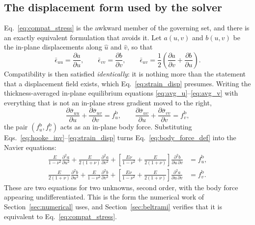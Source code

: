 \documentclass[11pt]{article}
\begin{document}
\subsection{The displacement form used by the solver}\label{sec:displacement_form}
Eq.~\eqref{eq:compat_stress} is the awkward member of the governing set, and
there is an exactly equivalent formulation that avoids it. Let $a(u,v)$ and
$b(u,v)$ be the in-plane displacements along $\hat u$ and $\hat v$, so that
\begin{equation}\label{eq:strain_disp}
    \bar\epsilon_{uu} = \frac{\partial a}{\partial u}, \qquad
    \bar\epsilon_{vv} = \frac{\partial b}{\partial v}, \qquad
    \bar\epsilon_{uv} = \frac{1}{2}\left(\frac{\partial a}{\partial v}
      + \frac{\partial b}{\partial u}\right).
\end{equation}
Compatibility is then satisfied \emph{identically}: it is nothing more than the
statement that a displacement field exists, which Eq.~\eqref{eq:strain_disp}
presumes. Writing the thickness-averaged in-plane equilibrium equations
\eqref{eq:avg_u}--\eqref{eq:avg_v} with everything that is not an in-plane stress
gradient moved to the right,
\begin{equation}\label{eq:body_force_def}
    \frac{\partial \bar\sigma_{uu}}{\partial u}
      + \frac{\partial \bar\sigma_{uv}}{\partial v} = f_u^{\mathrm b},
    \qquad
    \frac{\partial \bar\sigma_{uv}}{\partial u}
      + \frac{\partial \bar\sigma_{vv}}{\partial v} = f_v^{\mathrm b},
\end{equation}
the pair $\left(f_u^{\mathrm b}, f_v^{\mathrm b}\right)$ acts as an in-plane body
force. Substituting Eqs.~\eqref{eq:hooke_inv}--\eqref{eq:strain_disp} turns
Eq.~\eqref{eq:body_force_def} into the Navier equations:
\begin{align}
    \frac{E}{1-\nu^{2}}\frac{\partial^{2} a}{\partial u^{2}}
      + \frac{E}{2\left(1+\nu\right)}\frac{\partial^{2} a}{\partial v^{2}}
      + \left[\frac{E\nu}{1-\nu^{2}}
        + \frac{E}{2\left(1+\nu\right)}\right]
        \frac{\partial^{2} b}{\partial u\,\partial v}
      &= f_u^{\mathrm b},
      \label{eq:navier_u}\\
    \frac{E}{2\left(1+\nu\right)}\frac{\partial^{2} b}{\partial u^{2}}
      + \frac{E}{1-\nu^{2}}\frac{\partial^{2} b}{\partial v^{2}}
      + \left[\frac{E\nu}{1-\nu^{2}}
        + \frac{E}{2\left(1+\nu\right)}\right]
        \frac{\partial^{2} a}{\partial u\,\partial v}
      &= f_v^{\mathrm b}.
      \label{eq:navier_v}
\end{align}
These are two equations for two unknowns, second order, with the body force appearing undifferentiated. This is the form the numerical work of
Section~\ref{sec:numerical} uses, and Section~\ref{sec:beltrami} verifies that it is equivalent to Eq.~\eqref{eq:compat_stress}.
\end{document}
